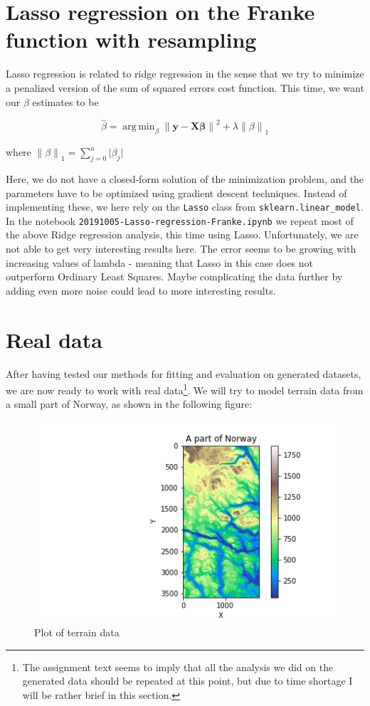 \documentclass{article}
\DeclareMathOperator*{\argminA}{arg\,min}
\begin{document}
\section{Lasso regression on the Franke function with resampling}
Lasso regression is related to ridge regression in the sense that we try to minimize a penalized version of the sum of squared errors cost function. This time, we want our $\beta$ estimates to be

$$
\hat{\beta} = \argminA_{\beta} \left\|\mathbf{y - X\beta}\right\|^2 + \lambda\left\|\beta\right\|_1
$$

where $\left\|\beta\right\|_1 = \sum_{j=0}^{n}{|\beta_j}|$

Here, we do not have a closed-form solution of the minimization problem, and the parameters have to be optimized using gradient descent techniques. Instead of implementing these, we here rely on the \texttt{Lasso} class from \texttt{sklearn.linear\_model}. In the notebook \texttt{20191005-Lasso-regression-Franke.ipynb} we repeat most of the above Ridge regression analysis, this time using Lasso. Unfortunately, we are not able to get very interesting results here. The error seems to be growing with increasing values of lambda - meaning that Lasso in this case does not outperform Ordinary Least Squares. Maybe complicating the data further by adding even more noise could lead to more interesting results.

\section{Real data}
After having tested our methods for fitting and evaluation on generated datasets, we are now ready to work with real data\footnote{The assignment text seems to imply that all the analysis we did on the generated data should be repeated at this point, but due to time shortage I will be rather brief in this section.}. We will try to model terrain data from a small part of Norway, as shown in the following figure:

\begin{figure}[h]
    \includegraphics{figures/map}
    \caption{Plot of terrain data}
    \label{}
\end{figure}
\end{document}
